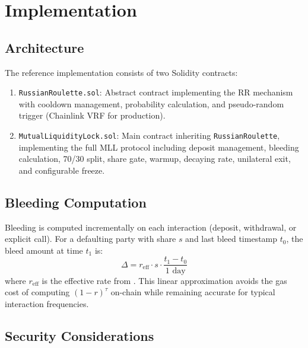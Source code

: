 \documentclass[12pt,a4paper]{article}
\begin{document}

\section{Implementation}
\label{sec:implementation}

\subsection{Architecture}

The reference implementation consists of two Solidity contracts:

\begin{enumerate}
\item \texttt{RussianRoulette.sol}: Abstract contract implementing the RR mechanism with cooldown management, probability calculation, and pseudo-random trigger (Chainlink VRF for production).
\item \texttt{MutualLiquidityLock.sol}: Main contract inheriting \texttt{RussianRoulette}, implementing the full MLL protocol including deposit management, bleeding calculation, 70/30 split, share gate, warmup, decaying rate, unilateral exit, and configurable freeze.
\end{enumerate}

\subsection{Bleeding Computation}

Bleeding is computed incrementally on each interaction (deposit, withdrawal, or explicit call). For a defaulting party with share $s$ and last bleed timestamp $t_0$, the bleed amount at time $t_1$ is:
\[
\Delta = r_{\text{eff}} \cdot s \cdot \frac{t_1 - t_0}{1 \text{ day}}
\]
where $r_{\text{eff}}$ is the effective rate from . This linear approximation avoids the gas cost of computing $(1-r)^\tau$ on-chain while remaining accurate for typical interaction frequencies.

\subsection{Security Considerations}
\end{document}
